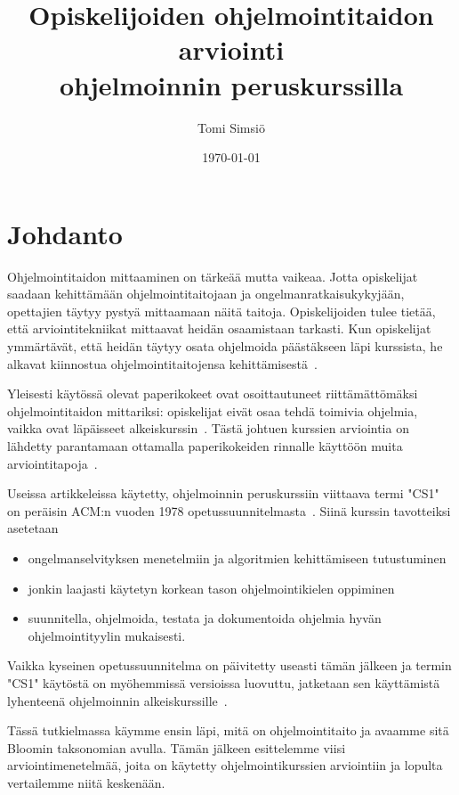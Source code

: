 \documentclass[finnish]{../tktltiki2}
\title{Opiskelijoiden ohjelmointitaidon arviointi \texorpdfstring{\\}{}ohjelmoinnin peruskurssilla}
\author{Tomi Simsiö}
\date{\today}
\theoremstyle{definition}
\theoremstyle{remark}
\begin{document}

\frontmatter

\maketitle
\makeabstract
\tableofcontents
\thispagestyle{empty}


\mainmatter

\section{Johdanto}

Ohjelmointitaidon mittaaminen on tärkeää mutta vaikeaa. Jotta opiskelijat saadaan kehittämään ohjelmointitaitojaan ja ongelmanratkaisukykyjään, opettajien täytyy pystyä mittaamaan näitä taitoja. Opiskelijoiden tulee tietää, että arviointitekniikat mittaavat heidän osaamistaan tarkasti. Kun opiskelijat ymmärtävät, että heidän täytyy osata ohjelmoida päästäkseen läpi kurssista, he alkavat kiinnostua ohjelmointitaitojensa kehittämisestä~\cite{DW04}.

Yleisesti käytössä olevat paperikokeet ovat osoittautuneet riittämättö\-mäksi ohjelmointitaidon mittariksi: opiskelijat eivät osaa tehdä toimivia ohjelmia, vaikka ovat läpäisseet alkeiskurssin~\cite{MAD01}. Tästä johtuen kurssien arviointia on lähdetty parantamaan ottamalla paperikokeiden rinnalle käyttöön muita arviointitapoja~\cite{CJ01, CG02, WM03}.

Useissa artikkeleissa käytetty, ohjelmoinnin peruskurssiin viittaava termi "CS1" on peräisin ACM:n vuoden 1978 opetussuunnitelmasta~\cite{ACM78}. Siinä kurssin tavotteiksi asetetaan
\begin{itemize}
  \item ongelmanselvityksen menetelmiin ja algoritmien kehittämiseen tutustuminen
  \item jonkin laajasti käytetyn korkean tason ohjelmointikielen oppiminen
  \item suunnitella, ohjelmoida, testata ja dokumentoida ohjelmia hyvän ohjelmointityylin mukaisesti.
\end{itemize}
Vaikka kyseinen opetussuunnitelma on päivitetty useasti tämän jälkeen ja termin "CS1" käytöstä on myöhemmissä versioissa luovuttu, jatketaan sen käyttämistä lyhenteenä ohjelmoinnin alkeiskurssille~\cite{H10}.

Tässä tutkielmassa käymme ensin läpi, mitä on ohjelmointitaito ja avaamme sitä Bloomin taksonomian avulla. Tämän jälkeen esittelemme viisi arviointimenetelmää, joita on käytetty ohjelmointikurssien arviointiin ja lopulta vertailemme niitä keskenään.
\end{document}
